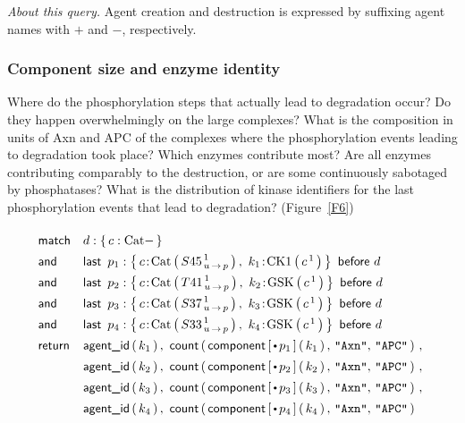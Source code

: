 \noindent \textit{About this query.} Agent creation and destruction is
expressed by suffixing agent names with $+$ and $-$,
respectively.


\subsubsection*{Component size and enzyme identity} 
Where do the phosphorylation steps that actually lead to degradation
occur? Do they happen overwhelmingly on the large complexes? What is
the composition in units of Axn and APC of the complexes where the
phosphorylation events leading to degradation took place?  Which
enzymes contribute most? Are all enzymes contributing comparably to
the destruction, or are some continuously sabotaged by phosphatases?
What is the distribution of kinase identifiers for the last
phosphorylation events that lead to degradation? (Figure~\ref{F6})

\newcommand{\BigHectorStoryLine}[4]{
\LastBefore{#1:\Set{ 
          \iAG{c}{\BetaCat}{ {#2}^{\,1}_{\Trans{u}{p}}}, \ 
          \iAG{#3}{#4}{c^{\,1}}
    }}{d}
}
\newcommand{\BigHectorStoryRet}[2]{
\AgentId{#2}, \ \Count{ \Component{\StateBefore{#1}}{#2}, \, 
      \STR{Axn}, \, \STR{APC} }
}


\begin{small}
\begin{equation}
  \Query{
    \m{match} & d:\Set{ c:\BetaCat - } \\
    \m{and} & \BigHectorStoryLine{p_1}{S45}{k_1}{\CKOne} \\
    \m{and} & \BigHectorStoryLine{p_2}{T41}{k_2}{\GSK}   \\
    \m{and} & \BigHectorStoryLine{p_3}{S37}{k_3}{\GSK}   \\
    \m{and} & \BigHectorStoryLine{p_4}{S33}{k_4}{\GSK}   \\
    \m{return} 
    & \BigHectorStoryRet{p_1}{k_1} \,,\  \\
    & \BigHectorStoryRet{p_2}{k_2} \,,\ \\
    & \BigHectorStoryRet{p_3}{k_3} \,,\  \\
    & \BigHectorStoryRet{p_4}{k_4} \\
  }
\end{equation}
\end{small}

